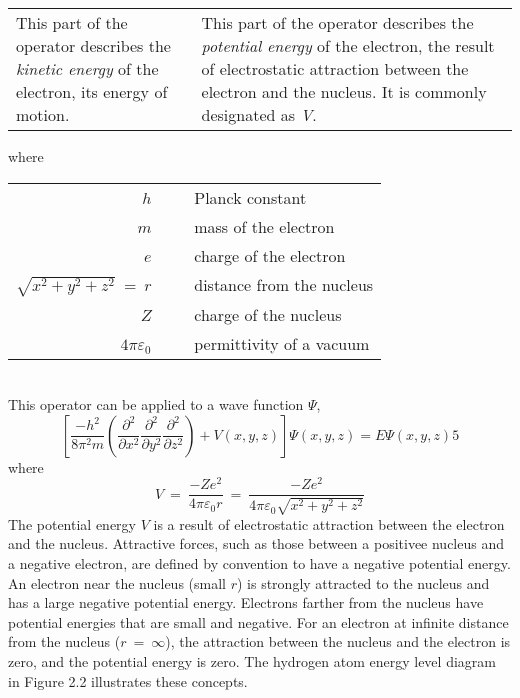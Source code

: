 \documentclass{article}
\begin{document}
\begin{center}
\begin{tabular}{p{6cm} p{5cm}}
This part of the operator describes the \emph{kinetic energy} of the
 electron, its energy of motion. & This part of the operator describes
 the \emph{potential energy} of the electron, the result of
 electrostatic attraction between the electron and the nucleus.
 It is commonly designated as \emph{V}.
\end{tabular}
\end{center}
\newpage
where\\
\begin{tabular}{r @{=} l}
$h$                            ~&~ Planck constant           \\
$m$                            ~&~ mass of the electron      \\
$e$                            ~&~ charge of the electron    \\
$\sqrt{x^{2}+y^{2}+z^{2}}~=~r$ ~&~ distance from the nucleus \\
$Z$                            ~&~ charge of the nucleus     \\
$4\pi\varepsilon_{0}$          ~&~ permittivity of a vacuum  \\
\end{tabular}\\[8pt]
This operator can be applied to a wave function $\Psi$,
\begin{displaymath}
\left[
\frac{-h^{2}}{8\pi^{2}m}
\left(
\frac{\partial^{2}}{{\partial}x^{2}}
\frac{\partial^{2}}{{\partial}y^{2}}
\frac{\partial^{2}}{{\partial}z^{2}}
\right)
+V(x, y ,z)
\right]
\Psi(x, y, z) = E\Psi(x, y, z)5
\end{displaymath}
where
\begin{displaymath}
V~=~\frac{-Ze^{2}}{4\pi\varepsilon_{0}r}~=~
\frac{-Ze^{2}}{4\pi\varepsilon_{0}\sqrt{x^{2}+y^{2}+z^{2}}}
\end{displaymath}
The potential energy $V$ is a result of electrostatic attraction between
 the electron and the nucleus. Attractive forces, such as those between
 a positivee nucleus and a negative electron, are defined by convention
 to have a negative potential energy. An electron near the nucleus
(small $r$) is strongly attracted to the nucleus and has a large
 negative potential energy. Electrons farther from the nucleus have
 potential energies that are small and negative. For an electron at
 infinite distance from the nucleus ($r~=~\infty$), the attraction
 between the nucleus and the electron is zero, and the potential energy
 is zero. The hydrogen atom energy level diagram in Figure 2.2
 illustrates these concepts.
\end{document}
